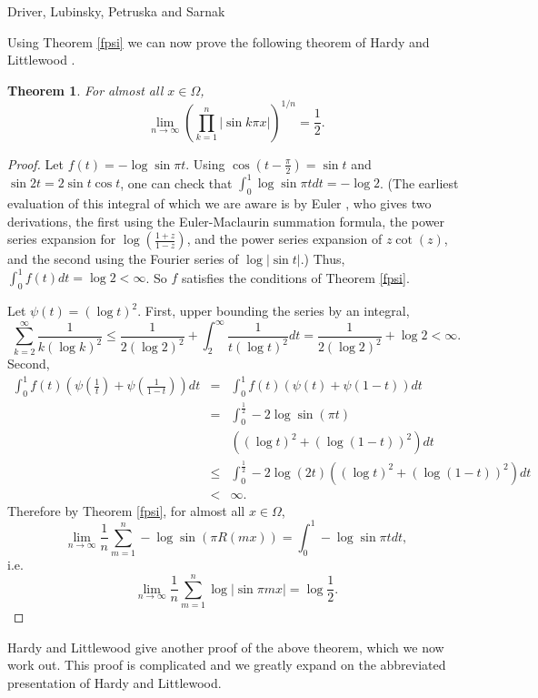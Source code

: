 \documentclass{amsart}
\newtheorem{theorem}{Theorem}
\begin{document}
Driver, Lubinsky, Petruska and Sarnak \cite{sarnak}


Using Theorem \ref{fpsi} we can now prove the following theorem of Hardy and Littlewood \cite[p.~88, Theorem~2]{XXIV}.

\begin{theorem}
For almost all $x \in \Omega$, 
\[
\lim_{n \to \infty} \left( \prod_{k=1}^n |\sin k\pi x| \right)^{1/n}=\frac{1}{2}.
\]
\label{bigtheorem}
\end{theorem}
\begin{proof}
Let $f(t)=-\log \sin \pi t$. Using $\cos(t-\frac{\pi}{2})=\sin t$ and $\sin 2t=2\sin t \cos t$, one can check that  $\int_0^1 \log \sin \pi t dt=-\log 2$. (The earliest evaluation of this integral of which we are aware
is by Euler \cite{E393}, who gives two derivations, the first using the Euler-Maclaurin summation formula, the power
series expansion for $\log\left( \frac{1+z}{1-z} \right)$, and the power series expansion of $z\cot(z)$,
and the second using the Fourier series of
$\log | \sin t|$.) Thus, $\int_0^1 f(t) dt=\log 2<\infty$. So $f$ satisfies the conditions of Theorem \ref{fpsi}.

Let $\psi(t)=(\log t)^2$. First, upper bounding the series by an integral,
\[
\sum_{k=2}^\infty \frac{1}{k(\log k)^2}\leq \frac{1}{2(\log 2)^2}+\int_2^\infty \frac{1}{t(\log t)^2} dt=
\frac{1}{2(\log 2)^2}+\log 2 <\infty.
\]
Second, 
\begin{eqnarray*}
\int_0^1 f(t) \left( \psi\left(\frac{1}{t}\right)+\psi\left(\frac{1}{1-t}\right) \right) dt&=&\int_0^1 f(t) \left(\psi(t)+\psi(1-t) \right) dt\\
&=&\int_0^{\frac{1}{2}} -2\log \sin (\pi t)\\
&& \left((\log t)^2+(\log(1-t))^2\right) dt \\
&\leq&\int_0^{\frac{1}{2}} -2\log (2t)  \left((\log t)^2+(\log(1-t))^2\right) dt \\
&<&\infty.
\end{eqnarray*}
Therefore by Theorem \ref{fpsi},
for almost all $x \in \Omega$,
\[
\lim_{n \to \infty} \frac{1}{n} \sum_{m=1}^n -\log \sin(\pi R(mx))= \int_0^1 -\log \sin \pi t dt,
\]
i.e.
\[
\lim_{n \to \infty} \frac{1}{n} \sum_{m=1}^n \log |\sin \pi m x|= \log \frac{1}{2}.
\]
\end{proof}


Hardy and Littlewood give another proof \cite[p.~86, Theorem~1]{XXIV} of the above theorem, which we now work out.
This proof is complicated and we greatly expand on the abbreviated presentation of Hardy and Littlewood.
\end{document}
